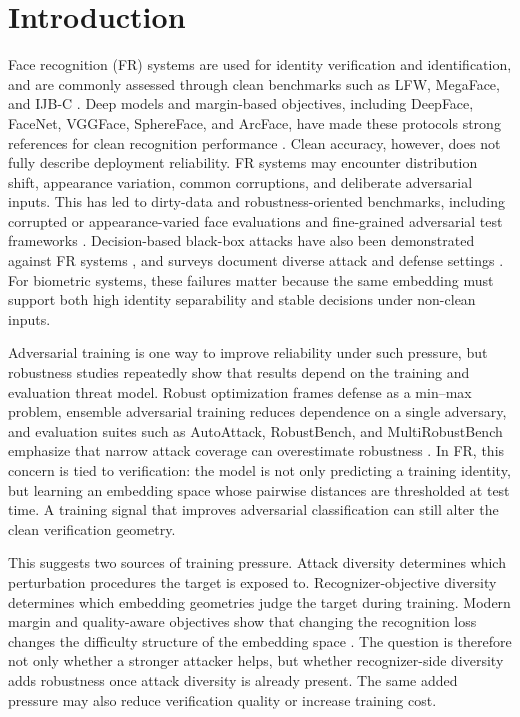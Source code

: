 \documentclass[conference]{IEEEtran}
\begin{document}
\section{Introduction}
Face recognition (FR) systems are used for identity verification and
identification, and are commonly assessed through clean benchmarks such as LFW,
MegaFace, and IJB-C \cite{lfw,megaface,ijbc}. Deep models and margin-based
objectives, including DeepFace, FaceNet, VGGFace, SphereFace, and ArcFace, have
made these protocols strong references for clean recognition performance
\cite{deepface,facenet,vggface,sphereface,arcface}. Clean accuracy, however,
does not fully describe deployment reliability. FR systems may encounter
distribution shift, appearance variation, common corruptions, and deliberate
adversarial inputs. This has led to dirty-data and robustness-oriented
benchmarks, including corrupted or appearance-varied face evaluations and
fine-grained adversarial test frameworks \cite{facesec,oodface}.
Decision-based black-box attacks have also been demonstrated against FR systems
\cite{dongattack}, and surveys document diverse attack and defense settings
\cite{frsurvey}. For biometric systems, these failures matter because the same
embedding must support both high identity separability and stable decisions
under non-clean inputs.

Adversarial training is one way to improve reliability under such pressure,
but robustness studies repeatedly show that results depend on the training and
evaluation threat model. Robust optimization frames defense as a min--max
problem, ensemble adversarial training reduces dependence on a single
adversary, and evaluation suites such as AutoAttack, RobustBench, and
MultiRobustBench emphasize that narrow attack coverage can overestimate
robustness \cite{madry,tramer,autoattack,robustbench,multirobustbench}. In FR,
this concern is tied to verification: the model is not only predicting a
training identity, but learning an embedding space whose pairwise distances are
thresholded at test time. A training signal that improves adversarial
classification can still alter the clean verification geometry.

This suggests two sources of training pressure. Attack diversity determines
which perturbation procedures the target is exposed to. Recognizer-objective
diversity determines which embedding geometries judge the target during
training. Modern margin and quality-aware objectives show that changing the
recognition loss changes the difficulty structure of the embedding space
\cite{arcface,cosface,curricularface,magface,adaface,elasticface}. The
question is therefore not only whether a stronger attacker helps, but whether
recognizer-side diversity adds robustness once attack diversity is already
present. The same added pressure may also reduce verification quality or
increase training cost.
\end{document}
